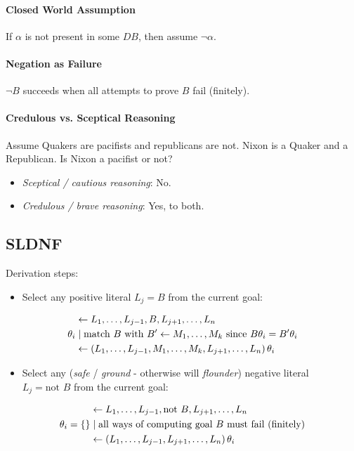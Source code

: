 \documentclass[twocolumn,english]{article}
\begin{document}
\paragraph{Closed World Assumption}

If $\alpha$ is not present in some $DB$, then assume $\lnot\alpha$.

\paragraph{Negation as Failure}

$\lnot B$ succeeds when all attempts to prove $B$ fail (finitely).

\paragraph{Credulous vs. Sceptical Reasoning}

Assume Quakers are pacifists and republicans are not. Nixon is a Quaker
and a Republican. Is Nixon a pacifist or not?
\begin{itemize}
\item \emph{Sceptical / cautious reasoning}: No.
\item \emph{Credulous / brave reasoning}: Yes, to both.
\end{itemize}

\subsection{SLDNF}

Derivation steps:
\begin{itemize}
\item Select any positive literal $L_{j}=B$ from the current goal:
\end{itemize}
\begin{align*}
\: & \leftarrow L_{1},\dots,L_{j-1},B,L_{j+1},\dots,L_{n}\\
\theta_{i} & \mid\text{match \ensuremath{B} with \ensuremath{B'\leftarrow M_{1},\dots,M_{k}} since \ensuremath{B\theta_{i}=B'\theta_{i}}}\\
\: & \leftarrow\left(L_{1},\dots,L_{j-1},M_{1},\dots,M_{k},L_{j+1},\dots,L_{n}\right)\theta_{i}
\end{align*}
\begin{itemize}
\item Select any (\emph{safe} / \emph{ground} - otherwise will \emph{flounder})
negative literal $L_{j}=\text{not }B$ from the current goal:
\end{itemize}
\begin{align*}
\: & \leftarrow L_{1},\dots,L_{j-1},\text{not }B,L_{j+1},\dots,L_{n}\\
\theta_{i}=\{\} & \mid\text{all ways of computing goal \ensuremath{B} must fail (finitely)}\\
\: & \leftarrow\left(L_{1},\dots,L_{j-1},L_{j+1},\dots,L_{n}\right)\theta_{i}
\end{align*}
\end{document}
